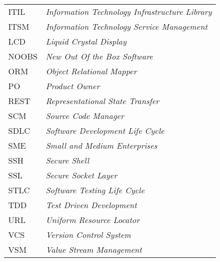 \begin{longtable}[c]{p{3cm} p{11cm}}
    ITIL & \textit{Information Technology Infrastructure Library} \\
    ITSM & \textit{Information Technology Service Management} \\
    LCD & \textit{Liquid Crystal Display} \\
    NOOBS & \textit{New Out Of the Box Software} \\
    ORM & \textit{Object Relational Mapper} \\
    PO & \textit{Product Owner} \\
    REST & \textit{Representational State Transfer} \\
    SCM & \textit {Source Code Manager}  \\
    SDLC & \emph{Software Development Life Cycle}  \\
    SME & \textit{Small and Medium Enterprises} \\
    SSH & \textit{Secure Shell} \\
    SSL & \textit{Secure Socket Layer} \\
    STLC & \emph{Software Testing Life Cycle}  \\
    TDD & \emph{Test Driven Development}  \\
    URL & \textit{Uniform Resource Locator} \\
    VCS & \textit {Version Control System} \\
    VSM & \textit {Value Stream Management} \\
\end{longtable}

\vskip20mm




